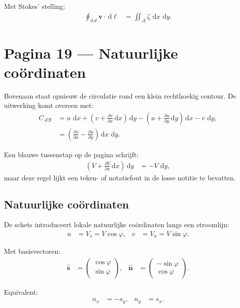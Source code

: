 \documentclass[11pt]{article}
\newcommand{\dd}{\,\mathrm{d}}
\newcommand{\vect}[1]{\mathbf{#1}}
\begin{document}
Met Stokes' stelling:
\begin{align*}
\oint_{\partial\mathcal{A}}\vect{v}\cdot\dd\vect{\ell}
  &=
  \iint_{\mathcal{A}}\zeta\,\dd x\,\dd y.
\end{align*}

\section*{Pagina 19 --- Natuurlijke coördinaten}

Bovenaan staat opnieuw de circulatie rond een klein rechthoekig contour. De uitwerking komt overeen met:
\begin{align*}
C_{\mathcal{A}\mathcal{B}}
  &=
  u\,\dd x
  +
  \left(
    v+\frac{\partial v}{\partial x}\dd x
  \right)\dd y
  -
  \left(
    u+\frac{\partial u}{\partial y}\dd y
  \right)\dd x
  -
  v\,\dd y,
\\
  &=
  \left(
  \frac{\partial v}{\partial x}
  -
  \frac{\partial u}{\partial y}
  \right)\dd x\,\dd y.
\end{align*}

Een blauwe tussenstap op de pagina schrijft:
\begin{align*}
\left(
V+\frac{\partial V}{\partial x}\dd x
\right)\dd y
  &=
  -V\,\dd y,
\end{align*}
maar deze regel lijkt een teken- of notatiefout in de losse notitie te bevatten.

\subsection*{Natuurlijke coördinaten}

De schets introduceert lokale natuurlijke coördinaten langs een stroomlijn:
\begin{align*}
u
  &=
  V_s
   =
  V\cos\varphi,
&
v
  &=
  V_n
   =
  V\sin\varphi.
\end{align*}

Met basisvectoren:
\begin{align*}
\hat{\vect{s}}
  &=
  \begin{pmatrix}
  \cos\varphi\\
  \sin\varphi
  \end{pmatrix},
&
\hat{\vect{n}}
  &=
  \begin{pmatrix}
  -\sin\varphi\\
  \cos\varphi
  \end{pmatrix}.
\end{align*}

Equivalent:
\begin{align*}
n_x
  &=
  -s_y,
&
n_y
  &=
  s_x.
\end{align*}
\end{document}
